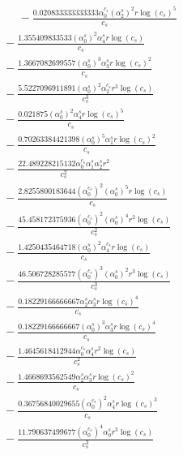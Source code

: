 \documentclass[10pt]{article}
\begin{document}
\begin{align*}
\phantom{R_{2,8}} &\phantom{={}}{}  - \frac{0.020833333333333 \alpha_{0}^{c_s} \left(\alpha_{2}^s\right)^{2} r \log{\left(c_{s} \right)}^{5}}{c_{s}} \\
&{}  - \frac{1.355409833533 \left(\alpha_{0}^s\right)^{2} \alpha_{4}^s r \log{\left(c_{s} \right)}}{c_{s}} \\
&{}  - \frac{1.3667082699557 \left(\alpha_{0}^s\right)^{3} \alpha_{3}^s r \log{\left(c_{s} \right)}^{2}}{c_{s}} \\
&{}  - \frac{5.5227096911891 \left(\alpha_{0}^s\right)^{2} \alpha_{2}^{c_s} r^{3} \log{\left(c_{s} \right)}}{c_{s}^{3}} \\
&{}  - \frac{0.021875 \left(\alpha_{0}^s\right)^{2} \alpha_{4}^s r \log{\left(c_{s} \right)}^{5}}{c_{s}} \\
&{}  - \frac{0.70263384421398 \left(\alpha_{0}^s\right)^{5} \alpha_{1}^s r \log{\left(c_{s} \right)}^{2}}{c_{s}} \\
&{}  - \frac{22.489228215132 \alpha_{0}^{c_s} \alpha_{1}^s \alpha_{2}^s r^{2}}{c_{s}^{2}} \\
&{}  - \frac{2.8255800183644 \left(\alpha_{0}^{c_s}\right)^{2} \left(\alpha_{0}^s\right)^{5} r \log{\left(c_{s} \right)}}{c_{s}} \\
&{}  - \frac{45.458172375936 \left(\alpha_{0}^{c_s}\right)^{2} \left(\alpha_{0}^s\right)^{4} r^{2} \log{\left(c_{s} \right)}}{c_{s}^{2}} \\
&{}  - \frac{1.4250435464718 \left(\alpha_{0}^s\right)^{2} \alpha_{4}^{c_s} r \log{\left(c_{s} \right)}}{c_{s}} \\
&{}  - \frac{46.506728285577 \left(\alpha_{0}^{c_s}\right)^{3} \left(\alpha_{0}^s\right)^{2} r^{3} \log{\left(c_{s} \right)}}{c_{s}^{3}} \\
&{}  - \frac{0.18229166666667 \alpha_{2}^s \alpha_{3}^s r \log{\left(c_{s} \right)}^{4}}{c_{s}} \\
&{}  - \frac{0.18229166666667 \left(\alpha_{0}^s\right)^{3} \alpha_{3}^s r \log{\left(c_{s} \right)}^{4}}{c_{s}} \\
&{}  - \frac{1.4645618412944 \alpha_{0}^{c_s} \alpha_{4}^s r^{2} \log{\left(c_{s} \right)}}{c_{s}^{2}} \\
&{}  - \frac{1.4668693562549 \alpha_{2}^s \alpha_{3}^s r \log{\left(c_{s} \right)}^{2}}{c_{s}} \\
&{}  - \frac{0.36756840029655 \left(\alpha_{0}^{c_s}\right)^{2} \alpha_{4}^s r \log{\left(c_{s} \right)}^{3}}{c_{s}} \\
&{}  - \frac{11.790637499677 \left(\alpha_{0}^{c_s}\right)^{4} \alpha_{0}^s r^{3} \log{\left(c_{s} \right)}}{c_{s}^{3}} \\

\end{align*}
\end{document}
